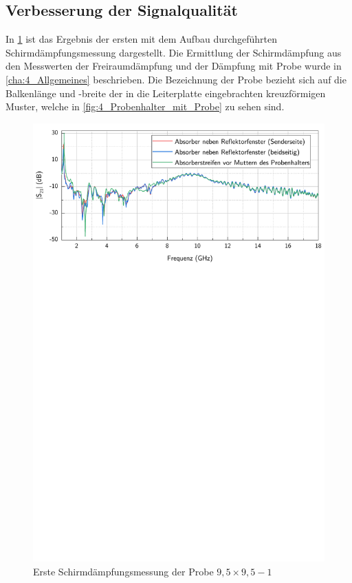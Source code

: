 \subsection{Verbesserung der Signalqualität}\label{cha:4_sub_Verbesserung_Signal}

In \Abb\ref{fig:4_erste_Messung} ist das Ergebnis der ersten mit dem Aufbau durchgeführten Schirmdämpfungsmessung dargestellt. Die Ermittlung der Schirmdämpfung aus den Messwerten der Freiraumdämpfung und der Dämpfung mit Probe wurde in \Abschnitt\ref{cha:4_Allgemeines} beschrieben. Die Bezeichnung der Probe bezieht sich auf die Balkenlänge und -breite der in die Leiterplatte eingebrachten kreuzförmigen Muster, welche in \Abb\ref{fig:4_Probenhalter_mit_Probe} zu sehen sind.
\par
\vspace{\linespace}


\begin{figure}[ht]
    \centering
    \includegraphics[page = 4, width = .99\textwidth, trim = 0cm 14.3cm 0cm 0cm, clip]{Abbildungen/Kapitel4/Messergebnisse/9k5x9k5-1.pdf}
    \caption{Erste Schirmdämpfungsmessung der Probe $9,5\times9,5-1$}
    \label{fig:4_erste_Messung}
\end{figure}


